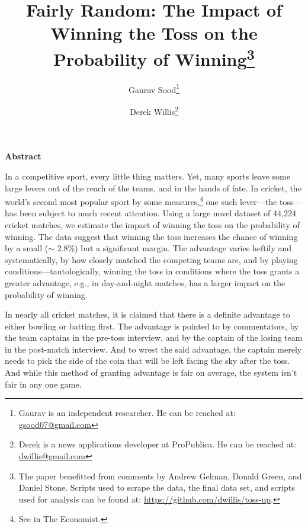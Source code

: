 \documentclass[12pt]{article}
\begin{document}
\title{\vspace{-.5cm}\normalsize{Fairly Random: The Impact of Winning the Toss on the Probability of Winning\footnote{The paper benefitted from comments by Andrew Gelman, Donald Green, and Daniel Stone. Scripts used to scrape the data, the final data set, and scripts used for analysis can be found at: \href{https://github.com/dwillis/toss-up}{https://github.com/dwillis/toss-up}. }\vspace{.5cm}}}
\author{\normalsize{Gaurav Sood}\footnote{Gaurav is an independent researcher. He can be reached at: \href{mailto:gsood07@gmail.com}{\small{gsood07@gmail.com}}} \and \normalsize{Derek Willis}\footnote{Derek is a  news applications developer at ProPublica. He can be reached at: \href{mailto:dwillis@gmail.com}{\small{dwillis@gmail.com}}}}\date{}
\maketitle
\doublespacing

\begin{center}\textbf{Abstract}\\\end{center}
In a competitive sport, every little thing matters. Yet, many sports leave some large levers out of the reach of the teams, and in the hands of fate. In cricket, the world's second most popular sport by some measures,\footnote{See \citet{Economist2011} in The Economist.} one such lever---the toss---has been subject to much recent attention. Using a large novel dataset of 44,224 cricket matches, we estimate the impact of winning the toss on the probability of winning. The data suggest that winning the toss increases the chance of winning by a small ($\sim$ 2.8\%) but a significant margin. The advantage varies heftily and systematically, by how closely matched the competing teams are, and by playing conditions---tautologically, winning the toss in conditions where the toss grants a greater advantage, e.g., in day-and-night matches, has a larger impact on the probability of winning.  
\clearpage

In nearly all cricket matches, it is claimed that there is a definite advantage to either bowling or batting first. The advantage is pointed to by commentators, by the team captains in the pre-toss interview, and by the captain of the losing team in the post-match interview. And to wrest the said advantage, the captain merely needs to pick the side of the coin that will be left facing the sky after the toss. And while this method of granting advantage is fair on average, the system isn't fair in any one game. 
\end{document}
